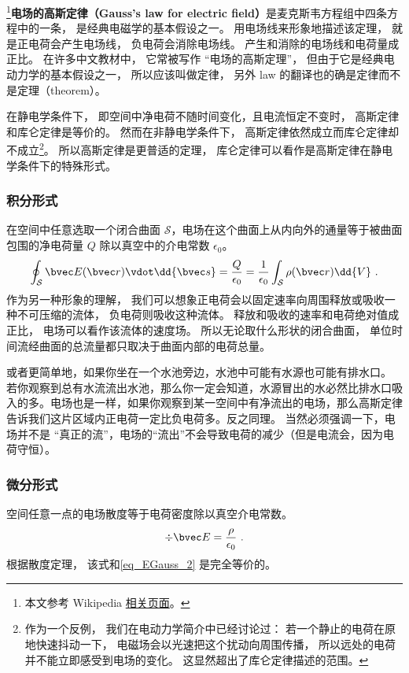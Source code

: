 

\footnote{本文参考 Wikipedia \href{https://en.wikipedia.org/wiki/Gauss's_law}{相关页面}。}\textbf{电场的高斯定律（Gauss's law for electric field）}是麦克斯韦方程组中四条方程中的一条， 是经典电磁学的基本假设之一。 用电场线来形象地描述该定理， 就是正电荷会产生电场线， 负电荷会消除电场线。 产生和消除的电场线和电荷量成正比。 在许多中文教材中， 它常被写作 “电场的高斯定理”， 但由于它是经典电动力学的基本假设之一， 所以应该叫做定律， 另外 law 的翻译也的确是定律而不是定理（theorem）。

在静电学条件下， 即空间中净电荷不随时间变化，且电流恒定不变时， 高斯定律和库仑定律是等价的。 然而在非静电学条件下， 高斯定律依然成立而库仑定律却不成立\footnote{作为一个反例， 我们在电动力学简介中已经讨论过： 若一个静止的电荷在原地快速抖动一下， 电磁场会以光速把这个扰动向周围传播， 所以远处的电荷并不能立即感受到电场的变化。 这显然超出了库仑定律描述的范围。}。 所以高斯定律是更普适的定理， 库仑定律可以看作是高斯定律在静电学条件下的特殊形式。

\subsubsection{积分形式}
在空间中任意选取一个闭合曲面 $\mathcal S$，电场在这个曲面上从内向外的通量等于被曲面包围的净电荷量 $Q$ 除以真空中的介电常数 $\epsilon_0$。
\begin{equation}\label{eq_EGauss_2}
\oint_{\mathcal S} \bvec E(\bvec r) \vdot \dd{\bvec s} = \frac{Q}{\epsilon_0} = \frac{1}{\epsilon_0} \int_{\mathcal S} \rho(\bvec r) \dd{V}~.
\end{equation}
作为另一种形象的理解， 我们可以想象正电荷会以固定速率向周围释放或吸收一种不可压缩的流体， 负电荷则吸收这种流体。 释放和吸收的速率和电荷绝对值成正比， 电场可以看作该流体的速度场。 所以无论取什么形状的闭合曲面， 单位时间流经曲面的总流量都只取决于曲面内部的电荷总量。

或者更简单地，如果你坐在一个水池旁边，水池中可能有水源也可能有排水口。 若你观察到总有水流流出水池，那么你一定会知道，水源冒出的水必然比排水口吸入的多。电场也是一样，如果你观察到某一空间中有净流出的电场，那么高斯定律告诉我们这片区域内正电荷一定比负电荷多。反之同理。 当然必须强调一下，电场并不是 “真正的流”，电场的“流出”不会导致电荷的减少（但是电流会，因为电荷守恒）。

\subsubsection{微分形式}
空间任意一点的电场散度等于电荷密度除以真空介电常数。
\begin{equation}\label{eq_EGauss_1}
\div \bvec E = \frac{\rho}{\epsilon_0}~.
\end{equation}
根据散度定理， 该式和\autoref{eq_EGauss_2} 是完全等价的。

